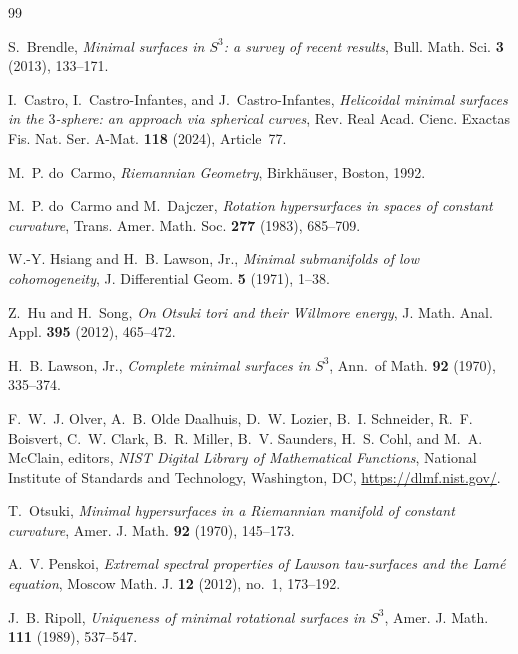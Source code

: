 \documentclass[a4paper,11pt]{amsart}
\numberwithin{equation}{section}
\theoremstyle{plain}
\begin{document}
\begin{thebibliography}{99}

S.~Brendle,
\emph{Minimal surfaces in $S^3$: a survey of recent results},
Bull. Math. Sci. \textbf{3} (2013), 133--171.

I.~Castro, I.~Castro-Infantes, and J.~Castro-Infantes,
\emph{Helicoidal minimal surfaces in the $3$-sphere:
an approach via spherical curves},
Rev. Real Acad. Cienc. Exactas Fis. Nat. Ser. A-Mat.
\textbf{118} (2024), Article~77.

M.~P. do~Carmo,
\emph{Riemannian Geometry},
Birkh\"auser, Boston, 1992.

M.~P. do~Carmo and M.~Dajczer,
\emph{Rotation hypersurfaces in spaces of constant curvature},
Trans. Amer. Math. Soc. \textbf{277} (1983), 685--709.

W.-Y. Hsiang and H.~B. Lawson, Jr.,
\emph{Minimal submanifolds of low cohomogeneity},
J. Differential Geom. \textbf{5} (1971), 1--38.

Z.~Hu and H.~Song,
\emph{On Otsuki tori and their Willmore energy},
J. Math. Anal. Appl. \textbf{395} (2012), 465--472.

H.~B. Lawson, Jr.,
\emph{Complete minimal surfaces in $S^3$},
Ann.\ of Math. \textbf{92} (1970), 335--374.

F.~W.~J. Olver, A.~B. Olde Daalhuis, D.~W. Lozier,
B.~I. Schneider, R.~F. Boisvert, C.~W. Clark, B.~R. Miller,
B.~V. Saunders, H.~S. Cohl, and M.~A. McClain, editors,
\emph{NIST Digital Library of Mathematical Functions},
National Institute of Standards and Technology, Washington, DC,
\url{https://dlmf.nist.gov/}.

T.~Otsuki,
\emph{Minimal hypersurfaces in a Riemannian manifold of constant curvature},
Amer. J. Math. \textbf{92} (1970), 145--173.

A.~V. Penskoi,
\emph{Extremal spectral properties of Lawson tau-surfaces
and the Lam\'e equation},
Moscow Math. J. \textbf{12} (2012), no.~1, 173--192.

J.~B. Ripoll,
\emph{Uniqueness of minimal rotational surfaces in $S^3$},
Amer. J. Math. \textbf{111} (1989), 537--547.

\end{thebibliography}
\end{document}
